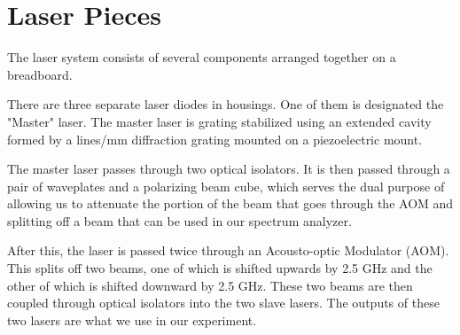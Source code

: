 \chapter{Laser Pieces}

The laser system consists of several components arranged together on a breadboard. 

There are three separate laser diodes in housings. One of them is designated the "Master" laser. The master laser is grating stabilized using an extended cavity formed by a  %
lines/mm diffraction grating mounted on a piezoelectric mount.  

The master laser passes through two optical isolators. It is then passed through a pair of waveplates and a polarizing beam cube, which serves the dual purpose of allowing us to attenuate the portion of the beam that goes through the AOM and splitting off a beam that can be used in our spectrum analyzer. 

After this, the laser is passed twice through an Acousto-optic Modulator (AOM). This splits off two beams, one of which is shifted upwards by 2.5 GHz and the other of which is shifted downward by 2.5 GHz. These two beams are then coupled through optical isolators into the two slave lasers. The outputs of these two lasers are what we use in our experiment.  
